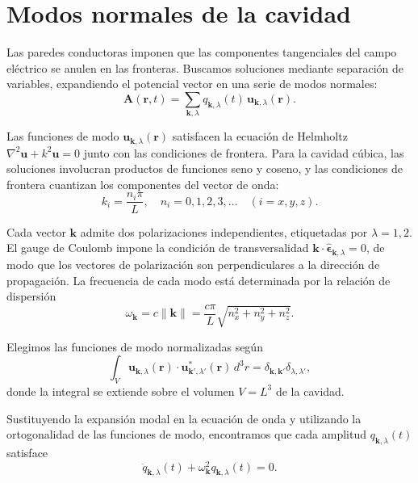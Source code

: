     \section{Modos normales de la cavidad}
    
    Las paredes conductoras imponen que las componentes tangenciales del campo eléctrico se anulen en las fronteras. Buscamos soluciones mediante separación de variables, expandiendo el potencial vector en una serie de modos normales:
    \begin{equation}
        \mathbf{A}(\mathbf{r}, t) = \sum_{\mathbf{k},\lambda} q_{\mathbf{k},\lambda}(t) \, \mathbf{u}_{\mathbf{k},\lambda}(\mathbf{r}).
    \end{equation}
    
    Las funciones de modo $\mathbf{u}_{\mathbf{k},\lambda}(\mathbf{r})$ satisfacen la ecuación de Helmholtz $\nabla^2 \mathbf{u} + k^2 \mathbf{u} = 0$ junto con las condiciones de frontera. Para la cavidad cúbica, las soluciones involucran productos de funciones seno y coseno, y las condiciones de frontera cuantizan los componentes del vector de onda:
    \begin{equation}
        k_i = \frac{n_i \pi}{L}, \quad n_i = 0, 1, 2, 3, \ldots \quad (i = x, y, z).
    \end{equation}
    
    Cada vector $\mathbf{k}$ admite dos polarizaciones independientes, etiquetadas por $\lambda = 1, 2$. El gauge de Coulomb impone la condición de transversalidad $\mathbf{k} \cdot \hat{\boldsymbol{\epsilon}}_{\mathbf{k},\lambda} = 0$, de modo que los vectores de polarización son perpendiculares a la dirección de propagación. La frecuencia de cada modo está determinada por la relación de dispersión
    \begin{equation}
        \omega_{\mathbf{k}} = c\|\mathbf{k}\| = \frac{c\pi}{L}\sqrt{n_x^2 + n_y^2 + n_z^2}.
    \end{equation}
    
    Elegimos las funciones de modo normalizadas según
    \begin{equation}
        \int_V \mathbf{u}_{\mathbf{k},\lambda}(\mathbf{r}) \cdot \mathbf{u}_{\mathbf{k}',\lambda'}^*(\mathbf{r}) \, d^3r = \delta_{\mathbf{k},\mathbf{k}'}\delta_{\lambda,\lambda'},
    \end{equation}
    donde la integral se extiende sobre el volumen $V = L^3$ de la cavidad.
    
    Sustituyendo la expansión modal en la ecuación de onda y utilizando la ortogonalidad de las funciones de modo, encontramos que cada amplitud $q_{\mathbf{k},\lambda}(t)$ satisface
    \begin{equation}
        \ddot{q}_{\mathbf{k},\lambda}(t) + \omega_{\mathbf{k}}^2 q_{\mathbf{k},\lambda}(t) = 0.
    \end{equation}
    
